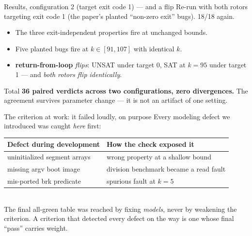 \documentclass[aspectratio=169]{beamer}
\newcommand{\lab}[1]{{\footnotesize\color{ink!65}#1}}
\newcommand{\key}[1]{\textbf{\color{accentdk}#1}}
\begin{document}
\begin{frame}{Results, configuration 2 (target exit code 1) --- and a flip}
  Re-run with both rotors targeting exit code 1 (the paper's planted
  ``non-zero exit'' bugs). \alert{18/18 again.}
  \vspace{0.3em}
  \begin{itemize}\setlength\itemsep{0.25em}\footnotesize
    \item The three exit-independent properties fire at unchanged bounds.
    \item Five planted bugs fire at $k \in [91,107]$ with identical $k$.
    \item \key{return-from-loop} \emph{flips}: UNSAT under target 0, SAT at
          $k=95$ under target 1 --- and \emph{both rotors flip identically}.
  \end{itemize}
  \vfill
  \begin{block}{Total}
    \textbf{36 paired verdicts across two configurations, zero divergences.}
    The agreement survives parameter change --- it is not an artifact of one
    setting.
  \end{block}
\end{frame}

\begin{frame}{The criterion at work: it failed loudly, on purpose}
  Every modeling defect we introduced was caught \emph{here} first:
  \vspace{0.3em}
  \centering\scriptsize
  \begin{tabular}{ll}
    \toprule
    Defect during development & How the check exposed it\\
    \midrule
    uninitialized segment arrays & wrong property at a shallow bound\\
    missing argv boot image & division benchmark became a read fault\\
    mis-ported brk predicate & spurious fault at $k=5$\\
    \bottomrule
  \end{tabular}
  \vspace{0.5em}\\
  \lab{The final all-green table was reached by fixing \emph{models}, never by
       weakening the criterion. A criterion that detected every defect on the
       way is one whose final ``pass'' carries weight.}
\end{frame}
\end{document}
